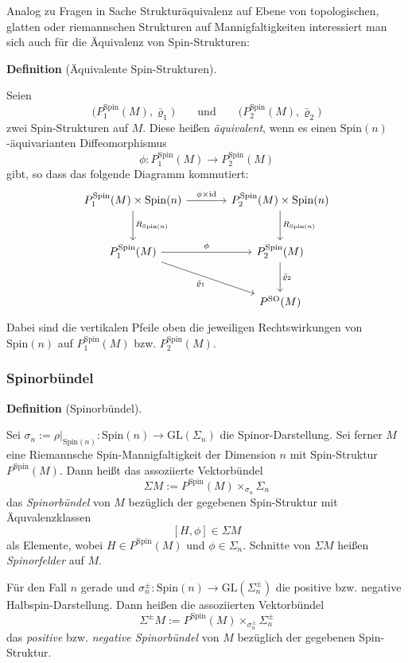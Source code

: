 \documentclass[10pt, letterpaper]{article}
\newcommand{\id}{\operatorname{id}}
\newcommand{\GL}{\mathrm{GL}}
\newcommand{\SO}{\mathrm{SO}}
\newcommand{\Spin}{\mathrm{Spin}}
\newcommand{\CustomHeading}[3]{%
  \par\medskip\noindent%
  \textbf{#1 #2} \textnormal{(#3)}.\enskip%
}
\newenvironment{DEF}[2]{\CustomHeading{Definition}{#1}{#2}}{}
\begin{document}
Analog zu Fragen in Sache Strukturäquivalenz auf Ebene von topologischen, glatten oder riemannschen Strukturen auf Mannigfaltigkeiten interessiert man sich auch für die Äquivalenz von Spin-Strukturen:

\begin{DEF}{}{Äquivalente Spin-Strukturen}
Seien
\[
\bigl(P_1^{\Spin}(M),\bar\varrho_1\bigr)
\qquad\text{und}\qquad
\bigl(P_2^{\Spin}(M),\bar\varrho_2\bigr)
\]
zwei Spin-Strukturen auf \(M\). Diese heißen \emph{äquivalent}, wenn es einen
\(\Spin(n)\)-äquivarianten Diffeomorphismus
\[
\phi:P_1^{\Spin}(M)\to P_2^{\Spin}(M)
\]
gibt, so dass das folgende Diagramm kommutiert:
\[
\begin{tikzcd}[column sep=large, row sep=large]
P_1^{\Spin}(M)\times \Spin(n) \arrow[r,"\phi\times \id"] \arrow[d,"R_{\Spin(n)}"] &
P_2^{\Spin}(M)\times \Spin(n) \arrow[d,"R_{\Spin(n)}"] \\
P_1^{\Spin}(M) \arrow[r,"\phi"] \arrow[dr,"\bar\varrho_1"'] &
P_2^{\Spin}(M) \arrow[d,"\bar\varrho_2"] \\
& P^{\SO}(M)
\end{tikzcd}
\]
Dabei sind die vertikalen Pfeile oben die jeweiligen Rechtswirkungen von
\(\Spin(n)\) auf \(P_1^{\Spin}(M)\) bzw. \(P_2^{\Spin}(M)\).
\end{DEF}



\subsubsection{Spinorbündel}

\begin{DEF}{}{Spinorbündel}
Sei $\sigma_n:=\rho|_{\Spin(n)}:\Spin(n)\to \GL(\Sigma_n)$ die Spinor-Darstellung. Sei ferner \(M\) eine Riemannsche Spin-Mannigfaltigkeit
der Dimension \(n\) mit Spin-Struktur \(P^{\Spin}(M)\). Dann heißt das assoziierte
Vektorbündel
\[
\Sigma M:=P^{\Spin}(M)\times_{\sigma_n}\Sigma_n
\]
das \emph{Spinorbündel} von \(M\) bezüglich der gegebenen Spin-Struktur mit Äquvalenzklassen 
$$[H,\phi]\in\Sigma M$$
als Elemente, wobei $H\in P^{\Spin}(M)$ und $\phi\in \Sigma_n$. Schnitte von \(\Sigma M\) heißen \emph{Spinorfelder} auf \(M\).

Für den Fall \(n\) gerade und $\sigma_n^\pm:\Spin(n)\to \GL(\Sigma_n^\pm)$
die positive bzw. negative Halbspin-Darstellung. Dann heißen die assoziierten
Vektorbündel
\[
\Sigma^\pm M:=P^{\Spin}(M)\times_{\sigma_n^\pm}\Sigma_n^\pm
\]
das \emph{positive} bzw. \emph{negative Spinorbündel} von \(M\) bezüglich der
gegebenen Spin-Struktur.
\end{DEF}
\end{document}
